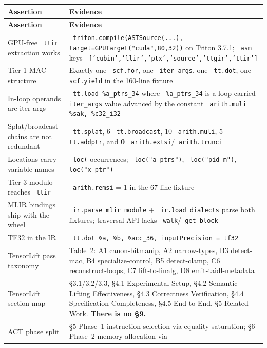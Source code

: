 \documentclass[11pt,a4paper]{article}
\newcommand{\code}[1]{\texttt{\small\hyphenchar\font=45 #1}}
\begin{document}
\begin{longtable}{@{}>{\raggedright\arraybackslash}p{4.6cm} >{\raggedright\arraybackslash}p{11.15cm}@{}}
\toprule
\textbf{Assertion} & \textbf{Evidence} \\
\midrule
\endfirsthead
\toprule
\textbf{Assertion} & \textbf{Evidence} \\
\midrule
\endhead
\bottomrule
\endlastfoot
GPU-free \code{ttir} extraction works & \code{triton.compile(ASTSource(...), target=GPUTarget("cuda",80,32))}
on Triton 3.7.1; \code{asm} keys \code{['cubin','llir','ptx','source','ttgir','ttir']} \\
\addlinespace
Tier-1 MAC structure & Exactly one \code{scf.for}, one \code{iter\_args}, one \code{tt.dot}, one
\code{scf.yield} in the 160-line fixture \\
\addlinespace
In-loop operands are iter-args & \code{tt.load \%a\_ptrs\_34} where \code{\%a\_ptrs\_34} is a loop-carried
\code{iter\_args} value advanced by the constant \code{arith.muli \%sak, \%c32\_i32} \\
\addlinespace
Splat/broadcast chains are not redundant & 13 \code{tt.splat}, 6 \code{tt.broadcast}, 10 \code{arith.muli},
5 \code{tt.addptr}, and \textbf{0} \code{arith.extsi}/\code{arith.trunci} \\
\addlinespace
Locations carry variable names & 169 \code{loc(} occurrences; \code{loc("a\_ptrs")}, \code{loc("pid\_m")},
\code{loc("x\_ptr")} \\
\addlinespace
Tier-3 modulo reaches \code{ttir} & \code{arith.remsi} = 1 in the 67-line fixture \\
\addlinespace
MLIR bindings ship with the wheel & \code{ir.parse\_mlir\_module} + \code{ir.load\_dialects} parse both
fixtures; traversal API lacks \code{walk}/\code{get\_block} \\
\addlinespace
TF32 in the IR & \code{tt.dot \%a, \%b, \%acc\_36, inputPrecision = tf32} \\
\addlinespace
TensorLift pass taxonomy & Table~2: A1 canon-bitmanip, A2 narrow-types, B3 detect-mac, B4 specialize-control,
B5 detect-clamp, C6 reconstruct-loops, C7 lift-to-linalg, D8 emit-taidl-metadata \\
\addlinespace
TensorLift section map & \S3.1/3.2/3.3, \S4.1 Experimental Setup, \S4.2 Semantic Lifting Effectiveness,
\S4.3 Correctness Verification, \S4.4 Specification Completeness, \S4.5 End-to-End, \S5 Related Work.
\textbf{There is no \S9.} \\
\addlinespace
ACT phase split & \S5 Phase~1 instruction selection via equality saturation; \S6 Phase~2 memory allocation via

\end{longtable}
\end{document}
